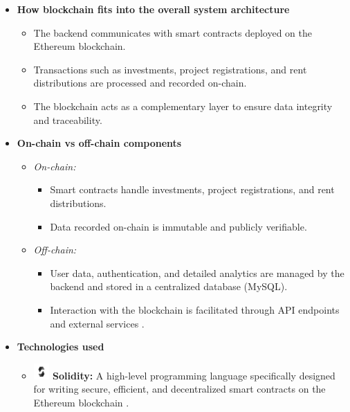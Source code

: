 \begin{itemize}
    \item \textbf{How blockchain fits into the overall system architecture}
    \begin{itemize}
        \item The backend communicates with smart contracts deployed on the Ethereum blockchain.
        \item Transactions such as investments, project registrations, and rent distributions are processed and recorded on-chain.
        \item The blockchain acts as a complementary layer to ensure data integrity and traceability.
    \end{itemize}

    \item \textbf{On-chain vs off-chain components}
    \begin{itemize}
        \item \textit{On-chain:}
        \begin{itemize}
            \item Smart contracts handle investments, project registrations, and rent distributions.
            \item Data recorded on-chain is immutable and publicly verifiable.
        \end{itemize}
        \item \textit{Off-chain:}
        \begin{itemize}
            \item User data, authentication, and detailed analytics are managed by the backend and stored in a centralized database (MySQL).
            \item Interaction with the blockchain is facilitated through API endpoints and external services \cite{Xu2019ArchitectingBlockchainApplications}.
        \end{itemize}
    \end{itemize}

    \item \textbf{Technologies used}
   \begin{itemize}
    \item \includegraphics[width=0.05\textwidth]{images/icons/solidity.png} \textbf{Solidity:} A high-level programming language specifically designed for writing secure, efficient, and decentralized smart contracts on the Ethereum blockchain \cite{SolidityDocs}.
    

\end{itemize}
\end{itemize}
